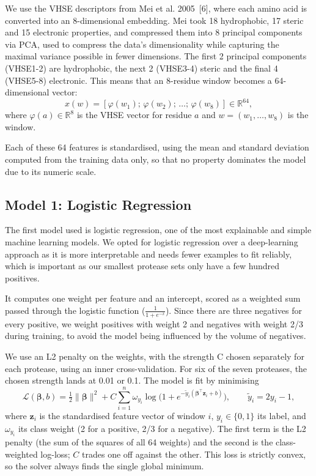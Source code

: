 \documentclass[10pt,a4paper]{article}
\numberwithin{equation}{section}
\newcommand{\cit}[1]{[#1]}
\newcommand{\R}{\mathbb{R}}
\newcommand{\bm}[1]{\boldsymbol{#1}}
\begin{document}
We use the VHSE descriptors from Mei et al. 2005~\cit{6}, where each amino acid is converted into an 8-dimensional embedding. Mei took 18 hydrophobic, 17 steric and 15 electronic properties, and compressed them into 8 principal components via PCA, used to compress the data's dimensionality while capturing the maximal variance possible in fewer dimensions. The first 2 principal components (VHSE1-2) are hydrophobic, the next 2 (VHSE3-4) steric and the final 4 (VHSE5-8) electronic. This means that an 8-residue window becomes a 64-dimensional vector:
\begin{equation}
x(w) = [\varphi(w_1);\,\varphi(w_2);\,\dots;\,\varphi(w_8)] \in \mathbb{R}^{64},
\label{eq:x}
\end{equation}
where $\varphi(a)\in\R^8$ is the VHSE vector for residue $a$ and $w=(w_1,\dots,w_8)$ is the window.

Each of these 64 features is standardised, using the mean and standard deviation computed from the training data only, so that no property dominates the model due to its numeric scale.

\subsection{Model 1: Logistic Regression}

The first model used is logistic regression, one of the most explainable and simple machine learning models. We opted for logistic regression over a deep-learning approach as it is more interpretable and needs fewer examples to fit reliably, which is important as our smallest protease sets only have a few hundred positives.

It computes one weight per feature and an intercept, scored as a weighted sum passed through the logistic function ($\frac{1}{1+e^{-x}}$). Since there are three negatives for every positive, we weight positives with weight 2 and negatives with weight 2/3 during training, to avoid the model being influenced by the volume of negatives.

We use an L2 penalty on the weights, with the strength C chosen separately for each protease, using an inner cross-validation. For six of the seven proteases, the chosen strength lands at 0.01 or 0.1. The model is fit by minimising
\begin{equation}
\mathcal{L}(\bm\beta,b)=\tfrac12\|\bm\beta\|^2+C\sum_{i=1}^{n}\omega_{y_i}\log\bigl(1+e^{-\tilde y_i(\bm\beta^{\top}\bm z_i+b)}\bigr),\qquad \tilde y_i=2y_i-1,
\label{eq:lr}
\end{equation}
where $\bm z_i$ is the standardised feature vector of window $i$, $y_i\in\{0,1\}$ its label, and $\omega_{y_i}$ its class weight (2 for a positive, 2/3 for a negative). The first term is the L2 penalty (the sum of the squares of all 64 weights) and the second is the class-weighted log-loss; $C$ trades one off against the other. This loss is strictly convex, so the solver always finds the single global minimum.
\end{document}
